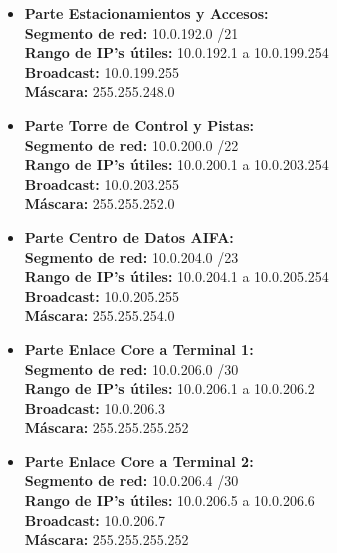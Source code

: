 \begin{itemize}[leftmargin=*]
    \item \textbf{Parte Estacionamientos y Accesos:} \\
    \textbf{Segmento de red:} 10.0.192.0 /21 \\
    \textbf{Rango de IP's útiles:} 10.0.192.1 a 10.0.199.254 \\
    \textbf{Broadcast:} 10.0.199.255 \\
    \textbf{Máscara:} 255.255.248.0 
    \vspace{5pt}

    \item \textbf{Parte Torre de Control y Pistas:} \\
    \textbf{Segmento de red:} 10.0.200.0 /22 \\
    \textbf{Rango de IP's útiles:} 10.0.200.1 a 10.0.203.254 \\
    \textbf{Broadcast:} 10.0.203.255 \\
    \textbf{Máscara:} 255.255.252.0 
    \vspace{5pt}

    \item \textbf{Parte Centro de Datos AIFA:} \\
    \textbf{Segmento de red:} 10.0.204.0 /23 \\
    \textbf{Rango de IP's útiles:} 10.0.204.1 a 10.0.205.254 \\
    \textbf{Broadcast:} 10.0.205.255 \\
    \textbf{Máscara:} 255.255.254.0 
    \vspace{5pt}

    \item \textbf{Parte Enlace Core a Terminal 1:} \\
    \textbf{Segmento de red:} 10.0.206.0 /30 \\
    \textbf{Rango de IP's útiles:} 10.0.206.1 a 10.0.206.2 \\
    \textbf{Broadcast:} 10.0.206.3 \\
    \textbf{Máscara:} 255.255.255.252 
    \vspace{5pt}

    \item \textbf{Parte Enlace Core a Terminal 2:} \\
    \textbf{Segmento de red:} 10.0.206.4 /30 \\
    \textbf{Rango de IP's útiles:} 10.0.206.5 a 10.0.206.6 \\
    \textbf{Broadcast:} 10.0.206.7 \\
    \textbf{Máscara:} 255.255.255.252 
    \vspace{5pt}


\end{itemize}

